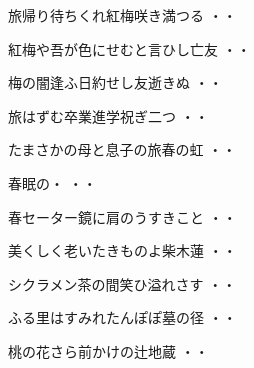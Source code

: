 \begin{shiika}旅帰り待ちくれ紅梅咲き満つる
\hfill{・・}\end{shiika}
\vspace{0.6cm}
\begin{shiika}紅梅や吾が色にせむと言ひし亡友
\hfill{・・}\end{shiika}
\vspace{0.6cm}
\begin{shiika}梅の闇逢ふ日約せし友逝きぬ
\hfill{・・}\end{shiika}
\vspace{0.6cm}
\begin{shiika}旅はずむ卒業進学祝ぎ二つ
\hfill{・・}\end{shiika}
\vspace{0.6cm}
\begin{shiika}たまさかの母と息子の旅春の虹
\hfill{・・}\end{shiika}
\vspace{0.6cm}
\begin{shiika}春眠の・
\hfill{・・}\end{shiika}
\vspace{0.6cm}
\begin{shiika}春セーター鏡に肩のうすきこと
\hfill{・・}\end{shiika}
\vspace{0.6cm}
\begin{shiika}美くしく老いたきものよ柴木蓮
\hfill{・・}\end{shiika}
\vspace{0.6cm}
\begin{shiika}シクラメン茶の間笑ひ溢れさす
\hfill{・・}\end{shiika}
\vspace{0.6cm}
\begin{shiika}ふる里はすみれたんぽぽ墓の径
\hfill{・・}\end{shiika}
\vspace{0.6cm}
\begin{shiika}桃の花さら前かけの辻地蔵
\hfill{・・}\end{shiika}
\vspace{0.6cm}
